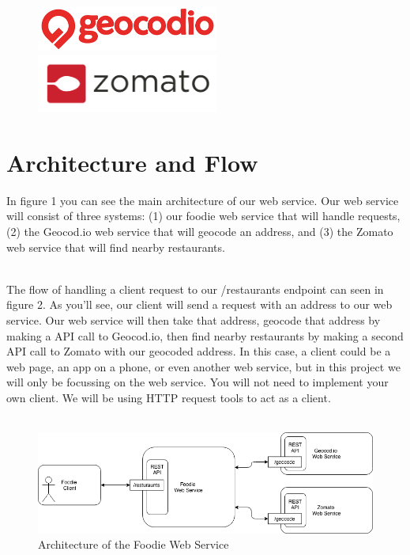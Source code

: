 \documentclass{article}
\begin{document}
\begin{figure}[h!]
 \centering
 \includegraphics[width=60mm]{images/geocodio}
 \includegraphics[width=60mm]{images/Zomato}
\end{figure} 

\section*{Architecture and Flow}
In figure 1 you can see the main architecture of our web service. Our web service will consist of three systems: (1) our foodie web service that will handle requests, (2) the Geocod.io web service that will geocode an address, and (3) the Zomato web service that will find nearby restaurants.


\-\ \\
The flow of handling a client request to our /restaurants endpoint can seen in figure 2. As you'll see, our client will send a request with an address to our web service. Our web service will then take that address, geocode that address by making a API call to Geocod.io, then find nearby restaurants by making a second API call to Zomato with our geocoded address. In this case, a client could be a web page, an app on a phone, or even another web service, but in this project we will only be focussing on the web service. You will not need to implement your own client. We will be using HTTP request tools to act as a client.  \\\\

\begin{figure}[h!]
    \includegraphics[width=\linewidth]{images/architecture}
    \caption{Architecture of the Foodie Web Service}
\end{figure}
\end{document}
